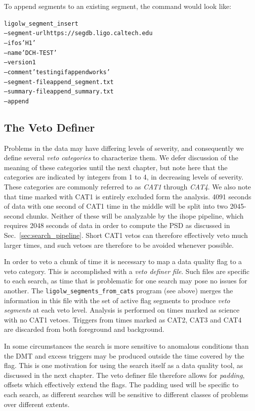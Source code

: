 {To append segments to an existing segment, the command would look like:
%
\begin{alltt}
ligolw\_segment\_insert 
  --segment-url https://segdb.ligo.caltech.edu
  --ifos 'H1'
  --name 'DCH-TEST'
  --version 1
  --comment 'testing if append works'
  --segment-file append\_segment.txt
  --summary-file append\_summary.txt
  --append
\end{alltt}


\subsection{The Veto Definer}
\label{sec:veto_definer}

Problems in the data may have differing levels of severity, and
consequently we define several \emph{veto categories} to characterize
them.  We defer discussion of the meaning of these categories until
the next chapter, but note here that the categories are indicated by
integers from 1 to 4, in decreasing levels of severity.  These
categories are commonly referred to as \emph{CAT1} through
\emph{CAT4}.  We also note that time marked with CAT1 is
entirely excluded form the analysis.  4091 seconds of data with one
second of CAT1 time in the middle will be split into two
2045-second chunks.  Neither of these will be analyzable by the ihope
pipeline, which requires 2048 seconds of data in order to compute the
PSD as discussed in Sec.~\ref{sec:search_pipeline}.  Short CAT1
vetos can therefore effectively veto much larger times, and such
vetoes are therefore to be avoided whenever possible. 

In order to veto a chunk of time it is necessary to map a data quality
flag to a veto category.  This is accomplished with a \emph{veto
definer file}.  Such files are specific to each search, as time that
is problematic for one search may pose no issues for another.  The
\texttt{ligolw\_segments\_from\_cats} program (see above) merges the
information in this file with the set of active flag segments to
produce \emph{veto segments} at each veto level.  Analysis is
performed on times marked as science with no CAT1 vetoes.  Triggers
from times marked as CAT2, CAT3 and CAT4 are discarded from both
foreground and background.

In some circumstances the search is more sensitive to anomalous
conditions than the DMT and excess triggers may be produced outside
the time covered by the flag.  This is one motivation for using the
search itself as a data quality tool, as discussed in the next
chapter.  The veto definer file therefore allows for \emph{padding},
offsets which effectively extend the flags.  The padding used will be
specific to each search, as different searches will be sensitive to
different classes of problems over different extents.

}
